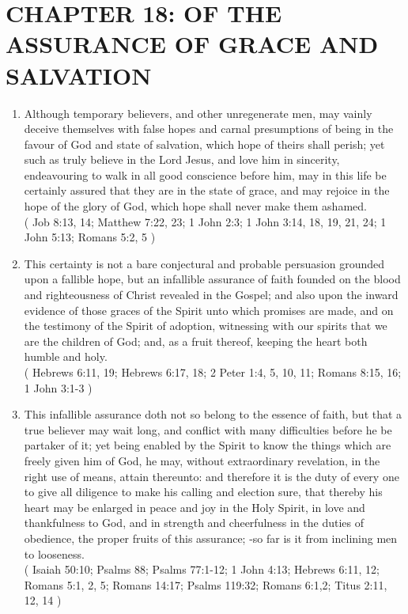 \documentclass[12pt,a4paper]{book}
\begin{document}
\chapter{CHAPTER 18: OF THE ASSURANCE OF GRACE AND SALVATION}
\label{ch-ass-gra-sal}
\begin{enumerate}
\item Although temporary believers, and other unregenerate men, may vainly deceive themselves with false hopes and carnal presumptions of being in the favour of God and state of salvation, which hope of theirs shall perish; yet such as truly believe in the Lord Jesus, and love him in sincerity, endeavouring to walk in all good conscience before him, may in this life be certainly assured that they are in the state of grace, and may rejoice in the hope of the glory of God, which hope shall never make them ashamed.\\
( Job 8:13, 14; Matthew 7:22, 23; 1 John 2:3; 1 John 3:14, 18, 19, 21, 24; 1 John 5:13; Romans 5:2, 5 )
\item This certainty is not a bare conjectural and probable persuasion grounded upon a fallible hope, but an infallible assurance of faith founded on the blood and righteousness of Christ revealed in the Gospel; and also upon the inward evidence of those graces of the Spirit unto which promises are made, and on the testimony of the Spirit of adoption, witnessing with our spirits that we are the children of God; and, as a fruit thereof, keeping the heart both humble and holy.\\
( Hebrews 6:11, 19; Hebrews 6:17, 18; 2 Peter 1:4, 5, 10, 11; Romans 8:15, 16; 1 John 3:1-3 )
\item This infallible assurance doth not so belong to the essence of faith, but that a true believer may wait long, and conflict with many difficulties before he be partaker of it; yet being enabled by the Spirit to know the things which are freely given him of God, he may, without extraordinary revelation, in the right use of means, attain thereunto: and therefore it is the duty of every one to give all diligence to make his calling and election sure, that thereby his heart may be enlarged in peace and joy in the Holy Spirit, in love and thankfulness to God, and in strength and cheerfulness in the duties of obedience, the proper fruits of this assurance; -so far is it from inclining men to looseness.\\
( Isaiah 50:10; Psalms 88; Psalms 77:1-12; 1 John 4:13; Hebrews 6:11, 12; Romans 5:1, 2, 5; Romans 14:17; Psalms 119:32; Romans 6:1,2; Titus 2:11, 12, 14 )

\end{enumerate}
\end{document}

